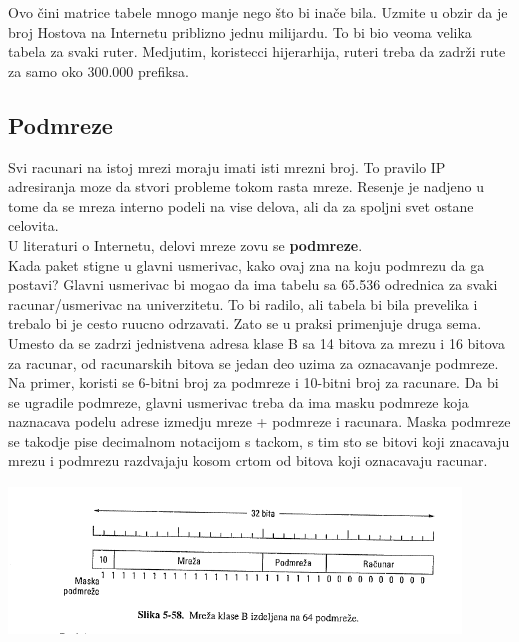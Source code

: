\documentclass{article} %
\begin{document}
Ovo čini matrice tabele mnogo manje nego što bi inače
bila.  Uzmite u obzir da je broj Hostova na Internetu priblizno jednu milijardu.
To bi bio veoma velika tabela za svaki ruter. Medjutim, koristecci
hijerarhija, ruteri treba da zadrži rute za samo oko 300.000 prefiksa.
\subsection{Podmreze}
Svi racunari na istoj mrezi moraju imati isti mrezni broj. To pravilo IP adresiranja moze da stvori probleme tokom rasta mreze. Resenje je nadjeno u tome da se mreza interno podeli na vise delova, ali da za spoljni svet ostane celovita.\\
 
U literaturi o Internetu, delovi mreze zovu se \textbf{podmreze}.\\

Kada paket stigne u glavni usmerivac, kako ovaj zna na koju podmrezu da ga postavi? Glavni usmerivac bi mogao da ima tabelu sa 65.536 odrednica za svaki racunar/usmerivac na univerzitetu. To bi radilo, ali tabela bi bila prevelika i trebalo bi je cesto ruucno odrzavati. Zato se u praksi primenjuje druga sema. Umesto da se zadrzi jednistvena adresa klase B sa 14 bitova za mrezu i 16 bitova za racunar, od racunarskih bitova se jedan deo uzima za oznacavanje podmreze. Na primer, koristi se 6-bitni broj za podmreze i 10-bitni broj za racunare. Da bi se ugradile podmreze, glavni usmerivac treba da ima masku podmreze koja naznacava podelu adrese izmedju mreze + podmreze i racunara. Maska podmreze se takodje pise decimalnom notacijom s tackom, s tim sto se bitovi koji znacavaju mrezu i podmrezu razdvajaju kosom crtom od bitova koji oznacavaju racunar. 
 \begin{center}
\includegraphics[width=12cm, height=4cm]{maskaPodmreze}\\
\end{center}
\end{document}
